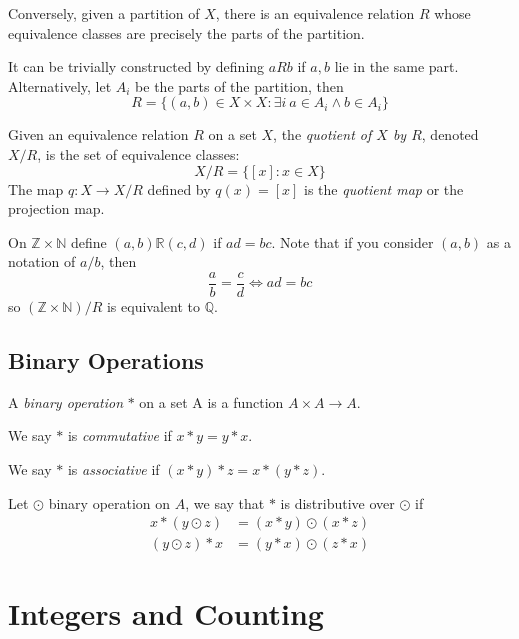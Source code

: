 \documentclass[12pt]{article}
\begin{document}
Conversely, given a partition of $X$,
there is an equivalence relation $R$ whose
equivalence classes are precisely 
the parts of the partition.

It can be trivially constructed by defining $aRb$ if
$a,b$ lie in the same part. Alternatively, let $A_i$
be the parts of the partition, then
\[
R = \{(a,b) \in X \times X : \exists i\ a \in A_i \land b \in A_i\}
\]

Given an equivalence relation $R$ on a set $X$,
the \emph{quotient of $X$ by $R$}, denoted $X/R$, is 
the set of equivalence classes:
\[
    X/R = \{[x] : x \in X\}
\]
The map $q : X \to X/R$ defined by $q(x) = [x]$ is
the \emph{quotient map} or the projection map.

On $\mathbb{Z} \times \mathbb{N}$ define $(a,b)\mathbb{R}(c,d)$ if
$ad = bc$. Note that if you consider $(a,b)$ as a notation of $a/b$, then
\[
\frac{a}{b} = \frac{c}{d} \iff ad = bc
\]
so $(\mathbb{Z} \times \mathbb{N})/R$ is equivalent to $\mathbb{Q}$.

\subsection{Binary Operations}

\begin{definition}
    A \emph{binary operation} $*$ on a set A is a function $A \times A \to A$.
\end{definition}

\begin{definition}
    We say $*$ is \emph{commutative} if $x * y = y * x$.
\end{definition}

\begin{definition}
    We say $*$ is \emph{associative} if $(x * y) * z = x * (y * z)$.
\end{definition}

\begin{definition}
    Let $\odot$ binary operation on $A$, we say that
    $*$ is distributive over $\odot$ if
    \begin{align*}
        x * (y \odot z) &= (x * y) \odot (x * z)\\
        (y \odot z) * x &= (y * x) \odot (z * x)
    \end{align*}
\end{definition}

\section{Integers and Counting}
\end{document}

